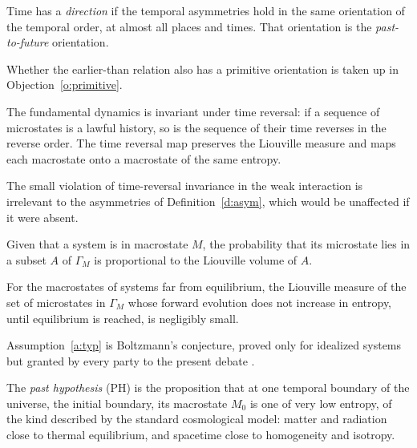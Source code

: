 \documentclass{situationist-preprint}
\begin{document}
\begin{definition}\label{d:direction}
Time has a \emph{direction} if the temporal asymmetries hold in the same orientation of the temporal order, at almost all places and times. That orientation is the \emph{past-to-future} orientation.
\end{definition}

Whether the earlier-than relation also has a primitive orientation is taken up in Objection~\ref{o:primitive}.

\begin{assumption}\label{a:sym}
The fundamental dynamics is invariant under time reversal: if a sequence of microstates is a lawful history, so is the sequence of their time reverses in the reverse order. The time reversal map preserves the Liouville measure and maps each macrostate onto a macrostate of the same entropy.
\end{assumption}

The small violation of time-reversal invariance in the weak interaction is irrelevant to the asymmetries of Definition~\ref{d:asym}, which would be unaffected if it were absent.

\begin{assumption}\label{a:sp}
Given that a system is in macrostate $M$, the probability that its microstate lies in a subset $A$ of $\Gamma_M$ is proportional to the Liouville volume of $A$.
\end{assumption}

\begin{assumption}\label{a:typ}
For the macrostates of systems far from equilibrium, the Liouville measure of the set of microstates in $\Gamma_M$ whose forward evolution does not increase in entropy, until equilibrium is reached, is negligibly small.
\end{assumption}

Assumption~\ref{a:typ} is Boltzmann's conjecture, proved only for idealized systems but granted by every party to the present debate \citep{Goldstein2001}.

\begin{definition}\label{d:ph}
The \emph{past hypothesis} (PH) is the proposition that at one temporal boundary of the universe, the initial boundary, its macrostate $M_0$ is one of very low entropy, of the kind described by the standard cosmological model: matter and radiation close to thermal equilibrium, and spacetime close to homogeneity and isotropy.
\end{definition}
\end{document}
